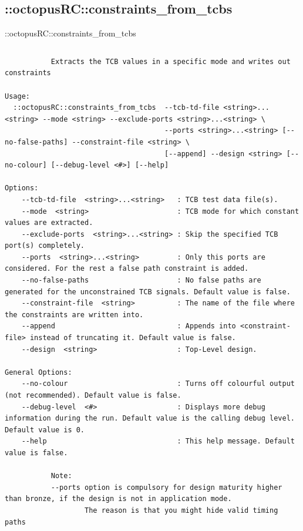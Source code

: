 \documentclass[handout]{beamer}
\begin{document}
\subsection{::octopusRC::constraints\_from\_tcbs}
\begin{frame}{::octopusRC::constraints\_from\_tcbs}
\begin{columns}
\begin{column}{1.1\textwidth}
	\tiny
	\begin{verbatim}
           Extracts the TCB values in a specific mode and writes out constraints

Usage:
  ::octopusRC::constraints_from_tcbs  --tcb-td-file <string>...<string> --mode <string> --exclude-ports <string>...<string> \
                                      --ports <string>...<string> [--no-false-paths] --constraint-file <string> \
                                      [--append] --design <string> [--no-colour] [--debug-level <#>] [--help]

Options:
    --tcb-td-file  <string>...<string>   : TCB test data file(s).
    --mode  <string>                     : TCB mode for which constant values are extracted.
    --exclude-ports  <string>...<string> : Skip the specified TCB port(s) completely.
    --ports  <string>...<string>         : Only this ports are considered. For the rest a false path constraint is added.
    --no-false-paths                     : No false paths are generated for the unconstrained TCB signals. Default value is false.
    --constraint-file  <string>          : The name of the file where the constraints are written into.
    --append                             : Appends into <constraint-file> instead of truncating it. Default value is false.
    --design  <string>                   : Top-Level design.

General Options:
    --no-colour                          : Turns off colourful output (not recommended). Default value is false.
    --debug-level  <#>                   : Displays more debug information during the run. Default value is the calling debug level. Default value is 0.
    --help                               : This help message. Default value is false.

           Note:
           --ports option is compulsory for design maturity higher than bronze, if the design is not in application mode.
                   The reason is that you might hide valid timing paths
	\end{verbatim}
  
\end{column}
\end{columns}
\end{frame}
\end{document}
